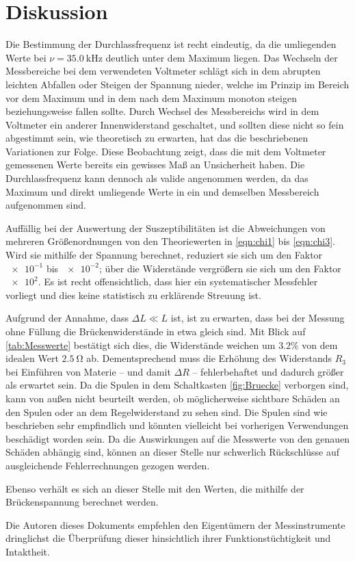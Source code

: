 \section{Diskussion}
\label{sec:Diskussion}

Die Bestimmung der Durchlassfrequenz ist recht eindeutig, da die umliegenden Werte bei $\nu=\SI{35.0}{\kilo\hertz}$ 
deutlich unter dem Maximum liegen. 
Das Wechseln der Messbereiche bei dem verwendeten Voltmeter schlägt sich in dem abrupten leichten Abfallen oder Steigen 
der Spannung nieder, welche im Prinzip im Bereich vor dem Maximum und in dem nach dem Maximum monoton steigen beziehungsweise 
fallen sollte. 
Durch Wechsel des Messbereichs wird in dem Voltmeter ein anderer Innenwiderstand geschaltet, und sollten diese nicht 
so fein abgestimmt sein, wie theoretisch zu erwarten, hat das die beschriebenen Variationen zur Folge. 
Diese Beobachtung zeigt, dass die mit dem Voltmeter gemessenen Werte bereits ein gewisses Maß an Unsicherheit haben. 
Die Durchlassfrequenz kann dennoch als valide angenommen werden, da das Maximum und direkt umliegende Werte 
in ein und demselben Messbereich aufgenommen sind. 

Auffällig bei der Auswertung der Suszeptibilitäten ist die Abweichungen von mehreren Größenordnungen von den Theoriewerten in \eqref{eqn:chi1} bis \eqref{eqn:chi3}. 
Wird sie mithilfe der Spannung berechnet, reduziert sie sich um den Faktor $\num{e-1}$ bis $\num{e-2}$; 
über die Widerstände vergrößern sie sich um den Faktor $\num{e2}$. 
Es ist recht offensichtlich, dass hier ein systematischer Messfehler vorliegt und dies keine statistisch zu erklärende Streuung ist.

Aufgrund der Annahme, dass $\Delta L\ll L$ ist, ist zu erwarten, dass bei der Messung ohne Füllung die Brückenwiderstände 
in etwa gleich sind. Mit Blick auf \ref{tab:Messwerte} bestätigt sich dies, die Widerstände weichen um $3.2\%$ von dem 
idealen Wert $\SI{2.5}{\ohm}$ ab. 
Dementsprechend muss die Erhöhung des Widerstands $R_3$ bei Einführen von Materie -- und damit $\Delta R$ -- fehlerbehaftet und dadurch größer als erwartet sein. 
Da die Spulen in dem Schaltkasten \ref{fig:Bruecke} verborgen sind, kann von außen nicht beurteilt werden, ob möglicherweise 
sichtbare Schäden an den Spulen oder an dem Regelwiderstand zu sehen sind. 
Die Spulen sind wie beschrieben sehr empfindlich und könnten vielleicht bei vorherigen Verwendungen beschädigt worden sein. 
Da die Auswirkungen auf die Messwerte von den genauen Schäden abhängig sind, können an dieser Stelle nur schwerlich Rückschlüsse 
auf ausgleichende Fehlerrechnungen gezogen werden. 

Ebenso verhält es sich an dieser Stelle mit den Werten, die mithilfe der Brückenspannung berechnet werden. 

Die Autoren dieses Dokuments empfehlen den Eigentümern der Messinstrumente dringlichst die Überprüfung dieser hinsichtlich 
ihrer Funktionstüchtigkeit und Intaktheit. 